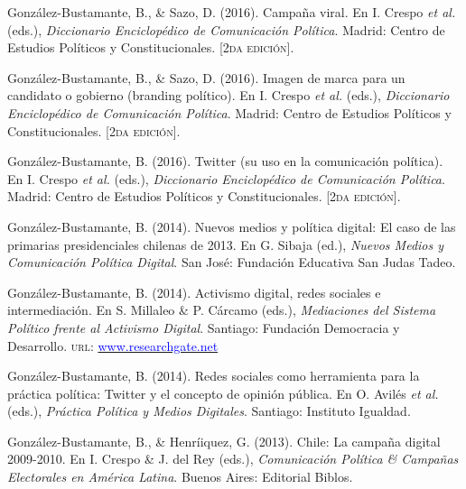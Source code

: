 \begin{publications}
\begin{benumerate}{12}
\item{\small González-Bustamante, B., \& Sazo, D. (2016). Campaña viral. En I. Crespo {\itshape et al.} (eds.), {\itshape Diccionario Enciclop\'edico de Comunicaci\'on Pol\'itica}. Madrid: Centro de Estudios Políticos y Constitucionales. {\footnotesize \scshape [2da edición]}.}\vspace{1mm}

\item{\small González-Bustamante, B., \& Sazo, D. (2016). Imagen de marca para un candidato o gobierno (branding político). En I. Crespo {\itshape et al.} (eds.), {\itshape Diccionario Enciclop\'edico de Comunicaci\'on Pol\'itica}. Madrid: Centro de Estudios Políticos y Constitucionales. {\footnotesize \scshape [2da edición]}.}\vspace{1mm}

\item{\small González-Bustamante, B. (2016). Twitter (su uso en la comunicación política). En I. Crespo {\itshape et al.} (eds.), {\itshape Diccionario Enciclop\'edico de Comunicaci\'on Pol\'itica}. Madrid: Centro de Estudios Políticos y Constitucionales. {\footnotesize \scshape [2da edición]}.}\vspace{1mm}

\item{\small González-Bustamante, B. (2014). Nuevos medios y política digital: El caso de las primarias presidenciales chilenas de 2013. En G. Sibaja (ed.), {\itshape Nuevos Medios y Comunicaci\'on Pol\'itica Digital}. San José: Fundación Educativa San Judas Tadeo.}\vspace{1mm}

\item{\small González-Bustamante, B. (2014). Activismo digital, redes sociales e intermediación. En S. Millaleo \& P. C\'arcamo (eds.), {\itshape Mediaciones del Sistema Pol\'itico frente al Activismo Digital}. Santiago: Fundación Democracia y Desarrollo. {\scshape url}: \href{https://www.researchgate.net/publication/321992867_Activismo_digital_redes_sociales_e_intermediacion}{\textcolor{blue}{www.researchgate.net}}}\vspace{1mm}

\item{\small González-Bustamante, B. (2014). Redes sociales como herramienta para la pr\'actica pol\'itica: Twitter y el concepto de opini\'on p\'ublica. En O. Avil\'es {\itshape et al.} (eds.), {\itshape Pr\'actica Pol\'itica y Medios Digitales}. Santiago: Instituto Igualdad.}\vspace{1mm}

\item{\small González-Bustamante, B., \& Henríiquez, G. (2013). Chile: La campaña digital 2009-2010. En I. Crespo \& J. del Rey (eds.), {\itshape Comunicaci\'on Pol\'itica \& Campa\~nas Electorales en Am\'erica Latina}. Buenos Aires: Editorial Biblos.}\vspace{1mm}

\end{benumerate}

\end{publications}
